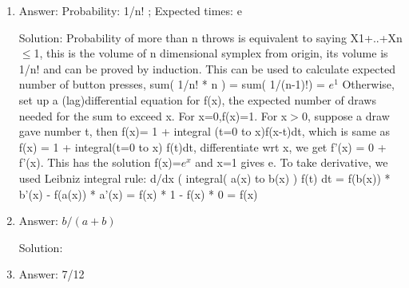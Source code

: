 \begin{enumerate}

\item
Answer: Probability: 1/n! ; Expected times:  e
 
Solution: Probability of more than n throws is equivalent to saying X1+..+Xn $\le$1, this is the volume of n dimensional symplex from origin, its volume is 1/n! and can be proved by induction. This can be used to calculate expected number of button presses, sum( 1/n! * n ) = sum( 1/(n-1)!) = $e^1$
Otherwise, set up a (lag)differential equation for f(x), the expected number of draws needed for the sum to exceed x. For x=0,f(x)=1. For x$>$0, suppose a draw gave number t, then f(x)= 1 + integral (t=0 to x)f(x-t)dt, which is same as f(x) = 1 + integral(t=0 to x) f(t)dt,  differentiate wrt x, we get f'(x) = 0 + f'(x). This has the solution f(x)=$e^x$ and x=1 gives e.
To take derivative, we used  Leibniz integral rule:
d/dx  ( integral( a(x) to b(x) ) f(t) dt = f(b(x)) * b'(x) - f(a(x)) * a'(x) = f(x) * 1 - f(x) * 0 = f(x)




\item
Answer: $b/(a+b)$
 
Solution: 




\item
Answer: 7/12
 

\end{enumerate}
